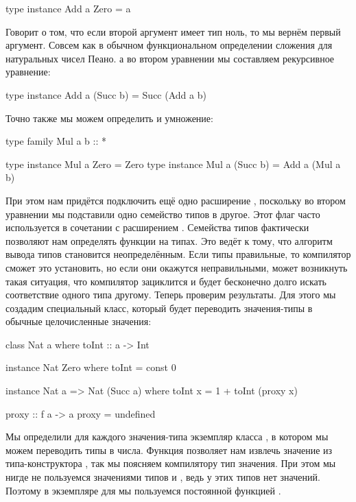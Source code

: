 \begin{code}
type instance Add a Zero        = a
\end{code}

Говорит о том, что если второй аргумент имеет
тип ноль, то мы вернём первый аргумент. Совсем как в обычном
функциональном определении сложения для натуральных чисел
Пеано. а во втором уравнении мы составляем рекурсивное 
уравнение:

\begin{code}
type instance Add a (Succ b)    = Succ (Add a b)
\end{code}

Точно также мы можем определить и умножение:

\begin{code}
type family Mul a b :: *

type instance Mul a Zero        = Zero
type instance Mul a (Succ b)    = Add a (Mul a b)
\end{code}

При этом нам придётся подключить ещё одно расширение
, поскольку во втором уравнении
мы подставили одно семейство типов в другое. Этот флаг часто
используется в сочетании с расширением . 
Семейства типов фактически позволяют нам определять 
функции на типах. Это ведёт к тому, что алгоритм вывода
типов становится неопределённым. Если типы правильные,
то компилятор сможет это установить, но если они окажутся 
неправильными, может возникнуть такая ситуация, что компилятор
зациклится и будет бесконечно долго искать соответствие
одного типа другому. Теперь проверим результаты. Для этого 
мы создадим специальный класс, который будет переводить 
значения-типы в обычные целочисленные значения:


\begin{code}
class Nat a where
    toInt :: a -> Int

instance Nat Zero where
    toInt = const 0

instance Nat a => Nat (Succ a) where
    toInt x = 1 + toInt (proxy x)
        
proxy :: f a -> a
proxy = undefined
\end{code}

Мы определили для каждого значения-типа экземпляр
класса , в котором мы можем переводить типы в числа.
Функция  позволяет нам извлечь значение из
типа-конструктора , так мы поясняем компилятору
тип значения. При этом мы нигде не пользуемся
значениями типов  и , ведь у этих типов 
нет значений. Поэтому в экземпляре для  мы пользуемся
постоянной функцией .


